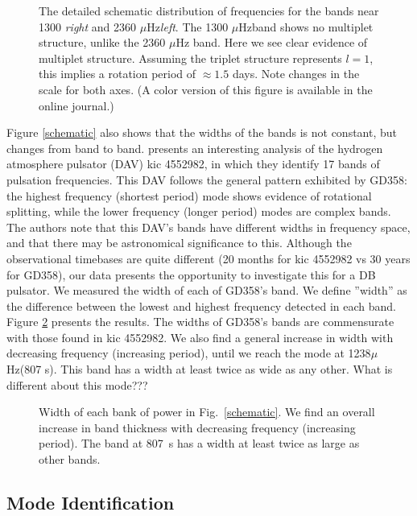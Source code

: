 \documentclass[12pt,preprint]{aastex}
\newcommand{\kicnsp}{kic }
\newcommand{\muHz}{\mbox{$\mu$Hz}}
\begin{document}
\begin{figure}
 \caption{The detailed schematic distribution of frequencies for the bands near 1300 {\em{right}}
 and 2360 \muHz {\em{left}}. The 1300 \muHz band shows no multiplet structure, unlike the 2360 \muHz
 band. Here we see clear evidence of multiplet structure. Assuming the triplet structure represents
 $l=1$, this implies a rotation period of $\approx 1.5$ days. Note changes in the scale for both axes.
 (A color version of this figure is available in the online journal.)
 \label{rot}}
\end{figure}

Figure \ref{schematic} also shows that the widths of the bands is not constant, but changes from band to band.
\citet{Bell15} presents an interesting analysis of the hydrogen atmosphere pulsator (DAV) \kicnsp 4552982, 
in which they identify 17 bands of pulsation frequencies. This DAV follows the general pattern exhibited 
by GD358: the highest frequency (shortest period) mode shows evidence of rotational splitting, while the 
lower frequency (longer period) modes are complex bands. The authors note that this DAV's bands have 
different widths in frequency space, and that there may be astronomical significance to this. Although the 
observational timebases are quite different (20 months for \kicnsp 4552982 vs 30 years for GD358), our 
data presents the opportunity to investigate this for a DB pulsator.  We measured the width of each of 
GD358's band. We define ''width'' as the difference between the lowest and highest frequency 
detected in each band. Figure \ref{thick} presents the results. The widths of GD358's bands are 
commensurate with those found in \kicnsp 4552982.  We also find a general increase in width with 
decreasing frequency (increasing period), until we reach the mode at 1238\muHz (807 s). This band has 
a width at least twice as wide as any other.  What is different about this mode???

\begin{figure}
 \caption{Width of each bank of power in Fig.~\ref{schematic}. We find an overall increase 
 in band thickness with decreasing frequency (increasing period).  The band at 807~s has a width
 at least twice as large as other bands.  
 \label{thick}}
\end{figure}


\subsection{Mode Identification}
\end{document}
